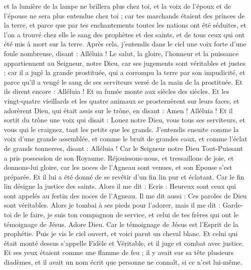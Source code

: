 \begin{multicols}{2}
et la lumière de la lampe ne brillera plus chez toi, et la voix de l'époux et de l'épouse ne sera plus entendue chez toi ; car tes marchands étaient des princes de la terre, et parce que par tes enchantements toutes les nations ont été séduites,
et l'on a trouvé chez elle le sang des prophètes et des saints, et de tous ceux qui ont été mis à mort sur la terre.
\VerseOne{}Après cela, j'entendis dans le ciel une voix forte d'une foule nombreuse, disant : Alléluia ! Le salut, la gloire, l'honneur et la puissance appartiennent au Seigneur, notre Dieu,
car ses jugements sont véritables et justes ; car il a jugé la grande prostituée, qui a corrompu la terre par son impudicité, et parce qu'il a vengé le sang de ses serviteurs versé de la main de la prostituée.
Et ils dirent encore : Alléluia ! Et sa fumée monte aux siècles des siècles.
Et les vingt-quatre vieillards et les quatre animaux se prosternèrent sur leurs faces, et adorèrent Dieu, qui était assis sur le trône, en disant : Amen ! Alléluia !
Et il sortit du trône une voix qui disait : Louez notre Dieu, vous tous ses serviteurs, et vous qui le craignez, tant les petits que les grands.
J'entendis ensuite comme la voix d'une grande assemblée, et comme le bruit de grandes eaux, et comme l'éclat de grands tonnerres, disant : Alléluia ! Car le Seigneur notre Dieu Tout-Puissant a pris possession de son Royaume.
Réjouissons-nous, et tressaillons de joie, et donnons-lui gloire, car les noces de l'Agneau sont venues, et son Epouse s'est préparée.
Et il lui a été donné de se revêtir d'un fin lin pur et éclatant. Car le fin lin désigne la justice des saints.
Alors il me dit : Ecris : Heureux sont ceux qui sont appelés au festin des noces de l'Agneau. Il me dit aussi : Ces paroles de Dieu sont véritables.
Alors je tombai à ses pieds pour l'adorer, mais il me dit : Garde-toi de le faire, je suis ton compagnon de service, et celui de tes frères qui ont le témoignage de Jésus. Adore Dieu. Car le témoignage de Jésus est l'Esprit de la prophétie.
Puis je vis le ciel ouvert, et voici parut un cheval blanc. Et celui qui était monté dessus s'appelle Fidèle et Véritable, et il juge et combat avec justice.
Et ses yeux étaient comme une flamme de feu ; il y avait sur sa tête plusieurs diadèmes, et il avait un nom écrit que personne ne connaît, si ce n'est lui-même.

\end{multicols}
